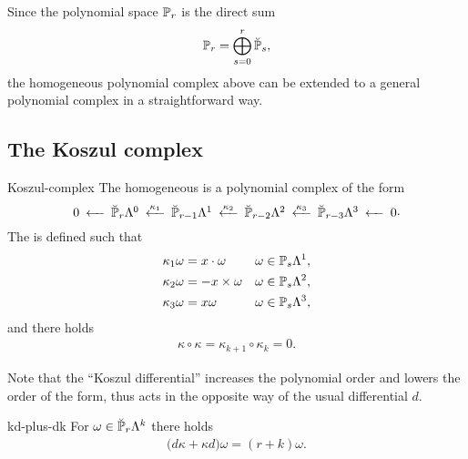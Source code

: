 \begin{remark}
  Since the polynomial space $\P_r$ is the direct sum
  \begin{gather}
    \P_r = \bigoplus_{s=0}^r \breve\P_s,
  \end{gather}
  the homogeneous polynomial complex above can be extended to a
  general polynomial complex in a straightforward way.
\end{remark}

\subsection{The Koszul complex}

\begin{Definition}{Koszul-complex}
  The homogeneous  is a polynomial complex of
  the form
  \begin{gather}\minCDarrowwidth15pt
    \label{eq:derham:12}
    \begin{CD}
      0
      @<<< \breve \P_r\Lambda^0
      @<{\kappa_1}<< \breve \P_{r-1}\Lambda^1
      @<{\kappa_2}<< \breve \P_{r-2}\Lambda^2
      @<{\kappa_3}<< \breve \P_{r-3}\Lambda^3
      @<<< 0
    \end{CD}.
  \end{gather}
  The  is defined such that
  \begin{gather}
    \label{eq:derham:13}
    \begin{aligned}
      \kappa_1\omega &= x\cdot\omega & \omega&\in \P_s\Lambda^1,\\
      \kappa_2\omega &= -x\times\omega & \omega&\in \P_s\Lambda^2,\\
      \kappa_3\omega &= x\omega & \omega&\in \P_s\Lambda^3,
    \end{aligned}
  \end{gather}
  and there holds
  \begin{gather}
    \label{eq:derham:14}
    \kappa\circ\kappa = \kappa_{k+1}\circ\kappa_k = 0.
  \end{gather}
\end{Definition}

Note that the ``Koszul differential'' increases the polynomial order
and lowers the order of the form, thus acts in the opposite way of the
usual differential $d$.

\begin{Lemma}{kd-plus-dk}
  For $\omega\in \breve \P_r\Lambda^k$ there holds
  \begin{gather}
    \label{eq:derham:15}
    \bigl(d\kappa+\kappa d\bigr)\omega = (r+k) \omega.
  \end{gather}
\end{Lemma}

